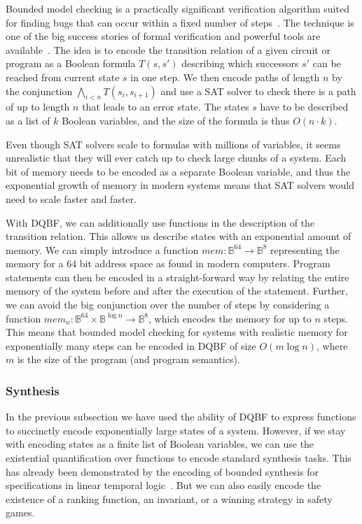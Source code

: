 \documentclass{svjour3}
\begin{document}
Bounded model checking is a practically significant verification algorithm suited for finding bugs that can occur within a fixed number of steps~\cite{BiereCCZ/1999/SymbolicModelCheckingWithoutBDDs}.
The technique is one of the big success stories of formal verification and powerful tools are available~\cite{KroeningAbrahamHavelund/2014/CBMC}.
The idea is to encode the transition relation of a given circuit or program as a Boolean formula $T(s,s')$ describing which successors $s'$ can be reached from current state $s$ in one step.
We then encode paths of length $n$ by the conjunction $\bigwedge_{i<n}T(s_i,s_{i+1})$ and use a SAT solver to check there is a path of up to length $n$ that leads to an error state.
The states $s$ have to be described as a list of $k$ Boolean variables, and the size of the formula is thus $O(n\cdot k)$.

Even though SAT solvers scale to formulas with millions of variables, it seems unrealistic that they will ever catch up to check large chunks of a system.
Each bit of memory needs to be encoded as a separate Boolean variable, and thus the exponential growth of memory in modern systems means that SAT solvers would need to scale faster and faster.

With DQBF, we can additionally use functions in the description of the transition relation.
This allows us describe states with an exponential amount of memory.
\newcommand{\mem}{\mathit{mem}}
We can simply introduce a function $\mem:\mathbb{B}^{64}\to\mathbb{B}^8$ representing the memory for a 64 bit address space as found in modern computers.
Program statements can then be encoded in a straight-forward way by relating the entire memory of the system before and after the execution of the statement.
Further, we can avoid the big conjunction over the number of steps by considering a function $\mem_n:\mathbb{B}^{64}\times\mathbb{B}^{\log n}\to\mathbb{B}^8$, which encodes the memory for up to $n$ steps.
This means that bounded model checking for systems with realistic memory for exponentially many steps can be encoded in DQBF of size $O(m\log n)$, where $m$ is the size of the program (and program semantics).

\subsubsection{Synthesis}

In the previous subsection we have used the ability of DQBF to express functions to succinctly encode exponentially large states of a system.
However, if we stay with encoding states as a finite list of Boolean variables, we can use the existential quantification over functions to encode standard synthesis tasks.
This has already been demonstrated by the encoding of bounded synthesis for specifications in linear temporal logic~\cite{FaymonvilleFinkbeinerRabeTentrup/2017/EncodingsOfBoundedSynthesis}.
But we can also easily encode the existence of a ranking function, an invariant, or a winning strategy in safety games.
\end{document}
